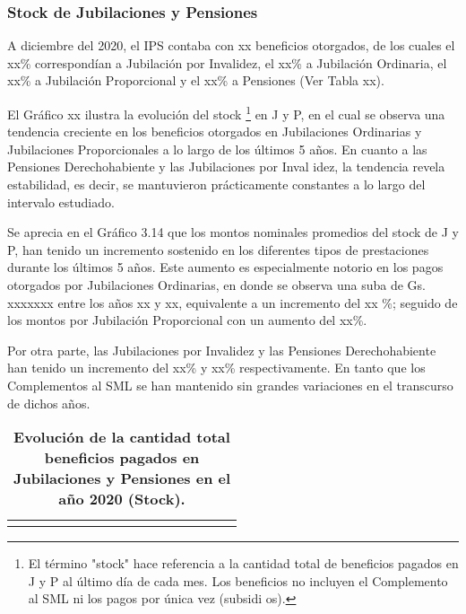 \subsubsection{Stock de Jubilaciones y Pensiones}

A diciembre del 2020, el IPS contaba con xx beneficios otorgados, de los
cuales el xx\% correspondían a Jubilación por Invalidez, el xx\% a
Jubilación Ordinaria, el xx\% a Jubilación Proporcional y el xx\% a
Pensiones (Ver Tabla xx).

El Gráfico xx ilustra la evolución del stock
\footnote{El término "stock" hace referencia a la cantidad total de beneficios pagados en J y P al último día de cada mes.  Los beneficios no incluyen el Complemento al SML ni los pagos por única vez (subsidi
os).} en J y P, en el cual se observa una tendencia creciente en los
beneficios otorgados en Jubilaciones Ordinarias y Jubilaciones
Proporcionales a lo largo de los últimos 5 años. En cuanto a las
Pensiones Derechohabiente y las Jubilaciones por Inval idez, la
tendencia revela estabilidad, es decir, se mantuvieron prácticamente
constantes a lo largo del intervalo estudiado.

Se aprecia en el Gráfico 3.14 que los montos nominales promedios del
stock de J y P, han tenido un incremento sostenido en los diferentes
tipos de prestaciones durante los últimos 5 años. Este aumento es
especialmente notorio en los pagos otorgados por Jubilaciones
Ordinarias, en donde se observa una suba de Gs. xxxxxxx entre los años
xx y xx, equivalente a un incremento del xx \%; seguido de los montos
por Jubilación Proporcional con un aumento del xx\%.

Por otra parte, las Jubilaciones por Invalidez y las Pensiones
Derechohabiente han tenido un incremento del xx\% y xx\%
respectivamente. En tanto que los Complementos al SML se han mantenido
sin grandes variaciones en el transcurso de dichos años.

\begin{table}[H]
\begin{center}
\caption{\bf{Evolución de la cantidad total beneficios pagados en Jubilaciones y Pensiones en el año 2020 (Stock).}}
\begin{tabular}{l|rrrrrrrrrrrrrrr}
\scriptsize
%
\end{tabular}
\end{center}
\end{table}

